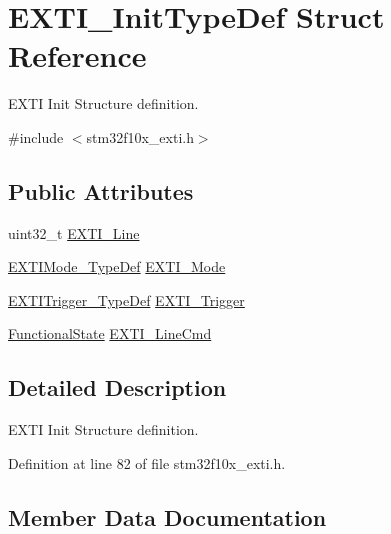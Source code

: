 \hypertarget{struct_e_x_t_i___init_type_def}{}\section{E\+X\+T\+I\+\_\+\+Init\+Type\+Def Struct Reference}
\label{struct_e_x_t_i___init_type_def}


E\+X\+TI Init Structure definition.  




{\ttfamily \#include $<$stm32f10x\+\_\+exti.\+h$>$}

\subsection*{Public Attributes}
\begin{DoxyCompactItemize}
\item 
uint32\+\_\+t \hyperlink{struct_e_x_t_i___init_type_def_a1b5bb38e1df331f764b830a1e8ec171f}{E\+X\+T\+I\+\_\+\+Line}
\item 
\hyperlink{group___e_x_t_i___exported___types_gad5e69af98dc0dfdf64417adc1cf57929}{E\+X\+T\+I\+Mode\+\_\+\+Type\+Def} \hyperlink{struct_e_x_t_i___init_type_def_a741816862b9cd43cc80781dc89150e7e}{E\+X\+T\+I\+\_\+\+Mode}
\item 
\hyperlink{group___e_x_t_i___exported___types_ga9da190f5425d1b421a06bced8cc48e9b}{E\+X\+T\+I\+Trigger\+\_\+\+Type\+Def} \hyperlink{struct_e_x_t_i___init_type_def_ab0bd8417e78fe2b43eed79e44064510c}{E\+X\+T\+I\+\_\+\+Trigger}
\item 
\hyperlink{group___exported__types_gac9a7e9a35d2513ec15c3b537aaa4fba1}{Functional\+State} \hyperlink{struct_e_x_t_i___init_type_def_ac1769bc5badaef4cffbcf105e3fe1c27}{E\+X\+T\+I\+\_\+\+Line\+Cmd}
\end{DoxyCompactItemize}


\subsection{Detailed Description}
E\+X\+TI Init Structure definition. 

Definition at line 82 of file stm32f10x\+\_\+exti.\+h.



\subsection{Member Data Documentation}
\mbox{\label{struct_e_x_t_i___init_type_def_a1b5bb38e1df331f764b830a1e8ec171f}} 
